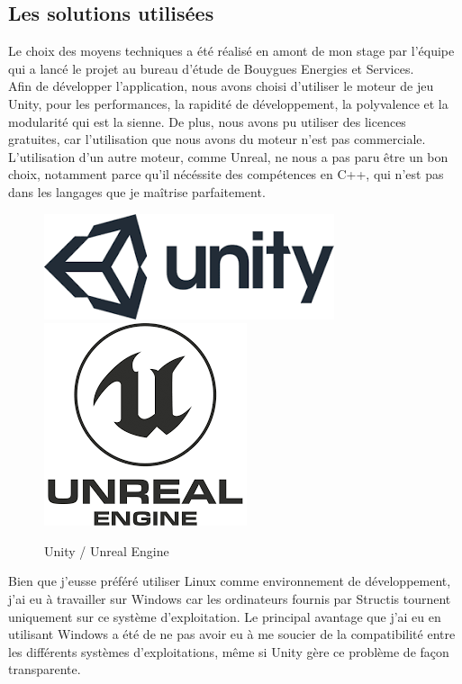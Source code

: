 \documentclass[a4paper]{article}
\begin{document}
    \subsection{Les solutions utilisées}

    Le choix des moyens techniques a été réalisé en amont de mon stage par l'équipe qui a lancé le projet au bureau d'étude de Bouygues Energies et Services. \\ 

    Afin de développer l'application, nous avons choisi d'utiliser le moteur de jeu Unity, pour les performances, la rapidité de développement, la polyvalence et la modularité qui est la sienne. De plus, nous avons pu utiliser des licences gratuites, car l'utilisation que nous avons du moteur n'est pas commerciale. L'utilisation d'un autre moteur, comme Unreal, ne nous a pas paru être un bon choix, notamment parce qu'il nécéssite des compétences en C++, qui n'est pas dans les langages que je maîtrise parfaitement. \\

    \begin{figure}[H]
        \centering
        \includegraphics[scale=0.5]{img/logo-unity}
        \hspace{10pt}
        \includegraphics[scale=0.5]{img/logo-unreal}
        \caption{Unity / Unreal Engine}
    \end{figure}

    Bien que j'eusse préféré utiliser Linux comme environnement de développement, j'ai eu à travailler sur Windows car les ordinateurs fournis par Structis tournent uniquement sur ce système d'exploitation. Le principal avantage que j'ai eu en utilisant Windows a été de ne pas avoir eu à me soucier de la compatibilité entre les différents systèmes d'exploitations, même si Unity gère ce problème de façon transparente. \\
\end{document}
